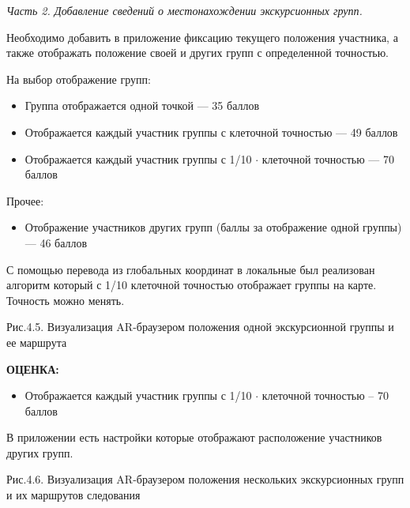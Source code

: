 \textit{Часть 2.  Добавление сведений о местонахождении экскурсионных групп.}

Необходимо добавить в приложение фиксацию текущего положения участника, а также отображать положение своей и других групп с определенной точностью.

\markSection
На выбор отображение групп:
\begin{itemize}
    \item Группа отображается одной точкой — 35 баллов
    \item Отображается каждый участник группы с клеточной точностью — 49 баллов
    \item Отображается каждый участник группы с 1/10 $\cdot$ клеточной точностью — 70 баллов
\end{itemize}
Прочее:
\begin{itemize}
    \item Отображение участников других групп (баллы за отображение одной группы) — 46 баллов
\end{itemize}

\solutionSection

С помощью перевода из глобальных координат в локальные был реализован алгоритм который с 1/10 клеточной точностью отображает группы на карте. Точность можно менять. 

\begin{center}
    Рис.4.5. Визуализация AR-браузером положения одной экскурсионной группы и ее маршрута
\end{center}

\textbf{ОЦЕНКА:}
\begin{itemize}
    \item Отображается каждый участник группы с 1/10 $\cdot$ клеточной точностью – 70 баллов
\end{itemize}
В приложении есть настройки которые отображают расположение участников других групп.

\begin{center}
    Рис.4.6. Визуализация AR-браузером положения нескольких экскурсионных групп и их   маршрутов следования
\end{center}